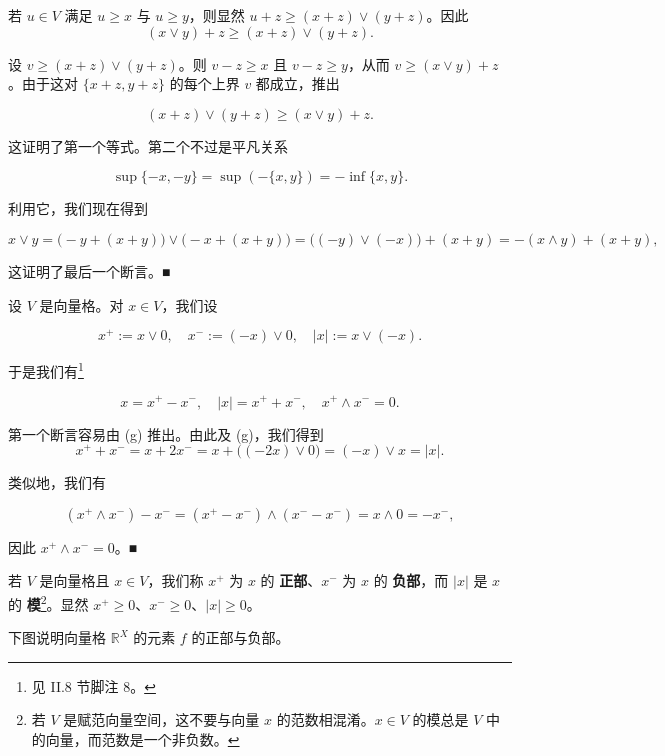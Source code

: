 \begin{example}
\begin{items}
\proofhead
若 $ u \in V $ 满足 $ u \ge x $ 与 $ u \ge y $，则显然 $ u + z \ge (x + z) \vee (y + z) $。因此
\[
(x \vee y) + z \ge (x + z) \vee (y + z) .
\]

设 $ v \ge (x + z) \vee (y + z) $。则 $ v - z \ge x $ 且 $ v - z \ge y $，从而 $ v \ge (x \vee y) + z $。由于这对 $ \{x + z, y + z\} $ 的每个上界 $ v $ 都成立，推出

\[
(x + z) \vee (y + z) \ge (x \vee y) + z .
\]

这证明了第一个等式。第二个不过是平凡关系

\[
\sup\{-x,-y\} = \sup(-\{x,y\}) = -\inf\{x,y\} .
\]

利用它，我们现在得到

\[
x \vee y = \bigl(-y + (x + y)\bigr) \vee \bigl(-x + (x + y)\bigr) = \bigl((-y) \vee (-x)\bigr) + (x + y) = -(x \wedge y) + (x + y) ,
\]

这证明了最后一个断言。\nobreak\hspace{0.35em}■

\item

设 $ V $ 是向量格。对 $ x \in V $，我们设

\[
x^{+} := x \vee 0 , \quad x^{-} := (-x) \vee 0 , \quad |x| := x \vee (-x) .
\]

于是我们有\footnote{见 II.8 节脚注 8。}

\[
x = x^{+} - x^{-} , \quad |x| = x^{+} + x^{-} , \quad x^{+} \wedge x^{-} = 0 .
\]

\proofhead
第一个断言容易由 (g) 推出。由此及 (g)，我们得到
\[
x^{+} + x^{-} = x + 2x^{-} = x + \bigl((-2x) \vee 0\bigr) = (-x) \vee x = |x| .
\]

类似地，我们有

\[
(x^{+} \wedge x^{-}) - x^{-} = (x^{+} - x^{-}) \wedge (x^{-} - x^{-}) = x \wedge 0 = -x^{-} ,
\]

因此 $ x^{+} \wedge x^{-} = 0 $。\nobreak\hspace{0.35em}■

\end{items}

若 $ V $ 是向量格且 $ x \in V $，我们称 $ x^{+} $ 为 $ x $ 的 \textbf{正部}、$ x^{-} $ 为 $ x $ 的 \textbf{负部}，而 $ |x| $ 是 $ x $ 的 \textbf{模}\footnote{若 $ V $ 是赋范向量空间，这不要与向量 $ x $ 的范数相混淆。$ x \in V $ 的模总是 $ V $ 中的向量，而范数是一个非负数。}。显然 $ x^{+} \ge 0 $、$ x^{-} \ge 0 $、$ |x| \ge 0 $。

下图说明向量格 $ \mathbb{R}^X $ 的元素 $ f $ 的正部与负部。


\end{example}
